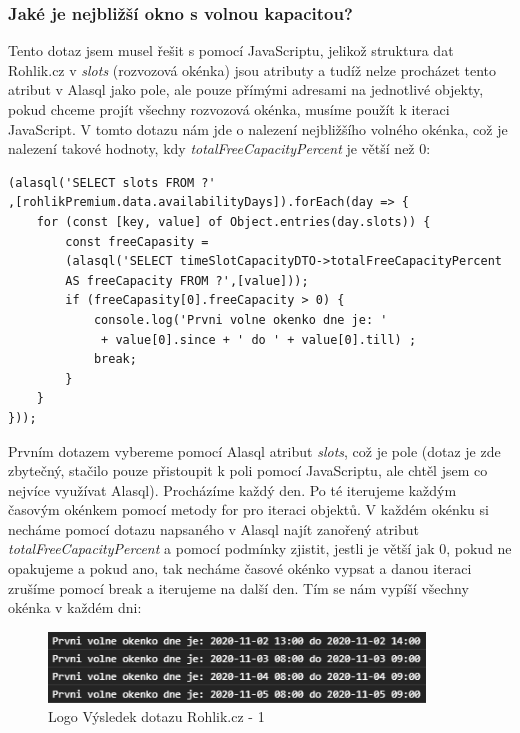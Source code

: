\documentclass[a4, titlepage]{article}
\begin{document}
\subsubsection{Jaké je nejbližší okno s volnou kapacitou?}
Tento dotaz jsem musel řešit s pomocí JavaScriptu, jelikož struktura dat Rohlik.cz v \textit{slots} (rozvozová okénka) jsou atributy a tudíž nelze procházet tento atribut v Alasql jako pole, ale pouze přímými adresami na jednotlivé objekty, pokud chceme projít všechny rozvozová okénka, musíme použít k iteraci JavaScript. V tomto dotazu nám jde o nalezení nejbližšího volného okénka, což je nalezení takové hodnoty, kdy \textit{totalFreeCapacityPercent} je větší než 0: 
\begin{lstlisting}
(alasql('SELECT slots FROM ?'
,[rohlikPremium.data.availabilityDays]).forEach(day => {
    for (const [key, value] of Object.entries(day.slots)) {
        const freeCapasity = 
        (alasql('SELECT timeSlotCapacityDTO->totalFreeCapacityPercent 
        AS freeCapacity FROM ?',[value]));
        if (freeCapasity[0].freeCapacity > 0) {
            console.log('Prvni volne okenko dne je: '
             + value[0].since + ' do ' + value[0].till) ;
            break;
        }
    }
}));
\end{lstlisting}
Prvním dotazem vybereme pomocí Alasql atribut \textit{slots}, což je pole (dotaz je zde zbytečný, stačilo pouze přistoupit k poli pomocí JavaScriptu, ale chtěl jsem co nejvíce využívat Alasql). Procházíme každý den. Po té iterujeme každým časovým okénkem pomocí metody for pro iteraci objektů. V každém okénku si necháme pomocí dotazu napsaného v Alasql najít zanořený atribut \textit{totalFreeCapacityPercent} a pomocí podmínky zjistit, jestli je větší jak 0, pokud ne opakujeme a pokud ano, tak necháme časové okénko vypsat a danou iteraci zrušíme pomocí break a iterujeme na další den. Tím se nám vypíší všechny okénka v každém dni:
\begin{figure}[h]
    \centering
    \includegraphics[width=10cm]{R1}
    \caption{Logo Výsledek dotazu Rohlik.cz - 1}
\end{figure}
\end{document}
